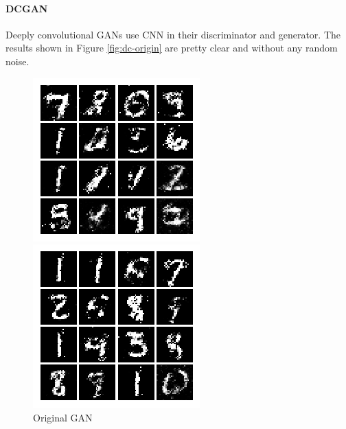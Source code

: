 \documentclass{article} %
\begin{document}
\paragraph{DCGAN} Deeply convolutional GANs use CNN in their discriminator and generator. The results shown in Figure \ref{fig:dc-origin} are pretty clear and without any random noise.
\begin{figure}[htbp]
	\begin{minipage}[t]{0.33\textwidth}
		\centering
		\includegraphics[width=\textwidth]{gan-origin.png}
		\caption{Original GAN}
		\label{fig:gan-origin}
	\end{minipage}
	\begin{minipage}[t]{.33\textwidth}
		\centering
		\includegraphics[width=\textwidth]{ls-gan.png}

\end{minipage}
\end{figure}
\end{document}
